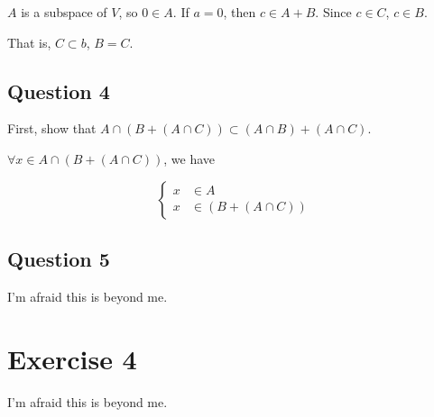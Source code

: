 \documentclass{article}
\begin{document}
$A$ is a subspace of $V$, so $0\in A$. If $a=0$, then $c\in A+B$. Since $c\in C$, $c\in B$.

That is, $C\subset b$, $B=C$.

\subsection{Question 4}

First, show that $A\cap (B+(A\cap C))\subset (A\cap B)+(A\cap C)$.

$\forall x\in A\cap (B+(A\cap C))$, we have

\begin{equation*}
\left\{\begin{aligned}
x&\in A\\
x&\in (B+(A\cap C))
\end{aligned}
\right.
\end{equation*}

\subsection{Question 5}

I'm afraid this is beyond me.

\section{Exercise 4}

I'm afraid this is beyond me.
\end{document}
